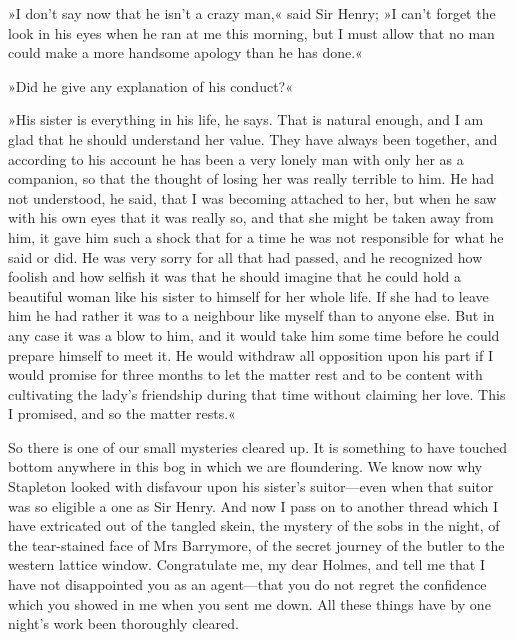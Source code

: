 »I don't say now that he isn't a crazy man,« said Sir Henry; »I can't forget the look in his eyes when he ran at me this morning, but I must allow that no man could make a more handsome apology than he has done.«

»Did he give any explanation of his conduct?«

»His sister is everything in his life, he says. That is natural e\-nough, and I am glad that he should understand her value. They have always been together, and according to his account he has been a very lonely man with only her as a companion, so that the thought of losing her was really terrible to him. He had not understood, he said, that I was becoming attached to her, but when he saw with his own eyes that it was really so, and that she might be taken away from him, it gave him such a shock that for a time he was not responsible for what he said or did. He was very sorry for all that had passed, and he recognized how foolish and how selfish it was that he should imagine that he could hold a beautiful woman like his sister to himself for her whole life. If she had to leave him he had rather it was to a neighbour like myself than to anyone else. But in any case it was a blow to him, and it would take him some time before he could prepare himself to meet it. He would withdraw all opposition upon his part if I would promise for three months to let the matter rest and to be content with cultivating the lady's friendship during that time without claiming her love. This I promised, and so the matter rests.«

So there is one of our small mysteries cleared up. It is something to have touched bottom anywhere in this bog in which we are floundering. We know now why Stapleton looked with disfavour upon his sister's suitor\allowbreak---\allowbreak even when that suitor was so eligible a one as Sir Henry. And now I pass on to another thread which I have extricated out of the tangled skein, the mystery of the sobs in the night, of the tear-stained face of Mrs Barrymore, of the secret journey of the butler to the western lattice window. Congratulate me, my dear Holmes, and tell me that I have not disappointed you as an agent\allowbreak---\allowbreak that you do not regret the confidence which you showed in me when you sent me down. All these things have by one night's work been thoroughly cleared.

